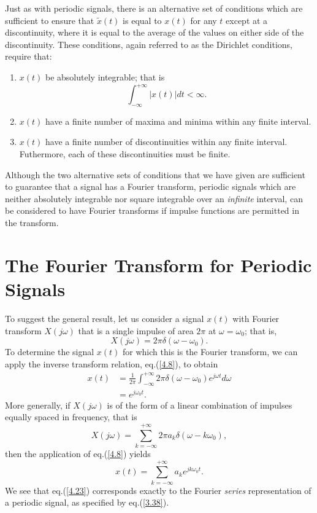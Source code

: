 \documentclass[a4paper,twoside]{book}
\begin{document}
Just as with periodic signals, there is an alternative set of conditions which are sufficient to ensure that $\tilde{x}(t)$ is equal to $x(t)$ for any $t$ except at a discontinuity, where it is equal to the average of the values on either side of the discontinuity. These conditions, again referred to as the Dirichlet conditions, require that:
\begin{enumerate}
    \item $x(t)$ be absolutely integrable; that is
    \begin{equation}
        \int_{-\infty}^{+\infty}|x(t)|dt<\infty.
        \label{4.13}
    \end{equation}
    \item $x(t)$ have a finite number of maxima and minima within any finite interval.
    \item $x(t)$ have a finite number of discontinuities within any finite interval. Futhermore, each of these discontinuities must be finite.
\end{enumerate}

Although the two alternative sets of conditions that we have given are sufficient to guarantee that a signal has a Fourier transform, periodic signals which are neither absolutely integrable nor square integrable over an \textit{infinite} interval, can be considered to have Fourier transforms if impulse functions are permitted in the transform.

\section{The Fourier Transform for Periodic Signals}

To suggest the general result, let us consider a signal $x(t)$ with Fourier transform $X(j\omega)$ that is a single impulse of area $2\pi$ at $\omega=\omega_0$; that is,
\begin{equation}
    X(j\omega)=2\pi\delta(\omega-\omega_0).
    \label{4.21}
\end{equation}
To determine the signal $x(t)$ for which this is the Fourier transform, we can apply the inverse transform relation, eq.\;(\ref{4.8}), to obtain
\begin{equation*}
    \begin{aligned}x(t)&= \frac{1}{2\pi}\int_{-\infty}^{+\infty}2\pi\delta(\omega-\omega_{0})e^{j\omega t} d\omega\\&= e^{j\omega_0t}.\end{aligned}
\end{equation*}
More generally, if $X(j\omega)$ is of the form of a linear combination of impulses equally spaced in frequency, that is
\begin{equation}
    X(j\omega)=\sum_{k=-\infty}^{+\infty}2\pi a_k\delta(\omega-k\omega_0),
    \label{4.22}
\end{equation}
then the application of eq.\;(\ref{4.8}) yields
\begin{equation}
    x(t)=\sum_{k=-\infty}^{+\infty}a_ke^{jk\omega_0t}.
    \label{4.23}
\end{equation}
We see that eq.\;(\ref{4.23}) corresponds exactly to the Fourier \textit{series} representation of a periodic signal, as specified by eq.\;(\ref{3.38}).
\end{document}
